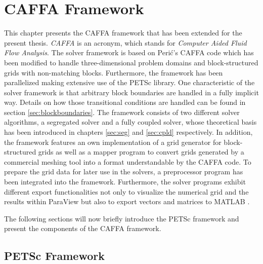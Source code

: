 \chapter{CAFFA Framework}
\label{sec:caffa}

This chapter presents the CAFFA framework that has been extended for the present thesis. \emph{CAFFA} is an acronym, which stands for \emph{Computer Aided Fluid Flow Analysis}. The solver framework is based on Peri\'c's CAFFA code \cite{ferziger02} which has been modified to handle three-dimensional problem domains and block-structured grids with non-matching blocks. Furthermore, the framework has been parallelized making extensive use of the PETSc library. One characteristic of the solver framework is that arbitrary block boundaries are handled in a fully implicit way. Details on how those transitional conditions are handled can be found in section \ref{sec:blockboundaries}. The framework consists of two different solver algorithms, a segregated solver and a fully coupled solver, whose theoretical basis has been introduced in chapters \ref{sec:seg} and \ref{sec:cpld} respectively. In addition, the framework features an own implementation of a grid generator for block-structured grids as well as a mapper program to convert grids generated by a commercial meshing tool into a format understandable by the CAFFA code. To prepare the grid data for later use in the solvers, a preprocessor program has been integrated into the framework. Furthermore, the solver programs exhibit different export functionalities not only to visualize the numerical grid and the results within ParaView \cite{paraview} but also to export vectors and matrices to MATLAB \textregistered \cite{matlab}.

The following sections will now briefly introduce the PETSc framework and present the components of the CAFFA framework.

\section{PETSc Framework}
\label{sec:petsc}

